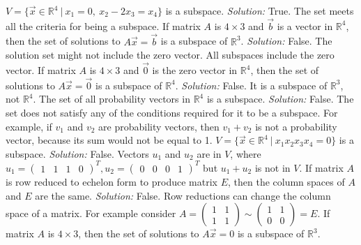 \ifnum {}         
    $V=\{ \vec x \in \mathbb R^4 \ | \ x_1 = 0, \ x_2-2x_3 = x_4 \}$ is a subspace.
    \ifnum {} {\color{DarkBlue} \textit{Solution: } True. The set meets all the criteria for being a subspace.} \fi
\fi
\ifnum {}      
    If matrix $A$ is $4\times3$ and $\vec b$ is a vector in $\mathbb R^4$, then the set of solutions to $A\vec x = \vec b$ is a subspace of $\mathbb R^3$. 
    \ifnum {} {\color{DarkBlue} \textit{Solution:  } False. The solution set might not include the zero vector. All subspaces include the zero vector. } \fi
\fi    
\ifnum {}
    If matrix $A$ is $4\times3$ and $\vec 0$ is the zero vector in $\mathbb R^4$, then the set of solutions to $A\vec x = \vec 0$ is a subspace of $\mathbb R^4$. 
    \ifnum {} {\color{DarkBlue} \textit{Solution:  } False. It is a subspace of $\mathbb R^3$, not $\mathbb R^4$. } \fi
\fi       
\ifnum {}
    The set of all probability vectors in $\mathbb R^4$ is a subspace. 
    \ifnum {} {\color{DarkBlue} \textit{Solution:  } False. The set does not satisfy any of the conditions required for it to be a subspace. For example, if $v_1$ and $v_2$ are probability vectors, then $v_1+v_2$ is not a probability vector, because its sum would not be equal to 1.  } \fi
\fi    
\ifnum {}    
    $V=\{ \vec x \in \mathbb R^4 \ | \ x_1  x_2 x_3 x_4 = 0\}$ is a subspace.
    \ifnum {} {\color{DarkBlue} \textit{Solution:  } False. Vectors $u_1$ and $u_2$ are in $V$, where \setlength{\extrarowheight}{0.0cm} $u_1 = \begin{pmatrix} 1&1&1&0 \end{pmatrix}^T, u_2 = \begin{pmatrix} 0&0&0&1\end{pmatrix}^T$ but $u_1+u_2$ is not in $V$.  } \fi
\fi    
\ifnum {}      
    If matrix $A$ is row reduced to echelon form to produce matrix $E$, then the column spaces of $A$ and $E$ are the same.  
    \ifnum {} {\color{DarkBlue} \textit{Solution:  } False. Row reductions can change the column space of a matrix. For example consider \setlength{\extrarowheight}{0.0cm} $A = \begin{pmatrix} 1&1\\1&1\end{pmatrix} \sim \begin{pmatrix} 1&1\\0&0\end{pmatrix} = E$. } \fi
\fi        
\ifnum {} 
    If matrix $A$ is $4\times3$, then the set of solutions to $A\vec x = 0$ is a subspace of $\mathbb R^3$. 
